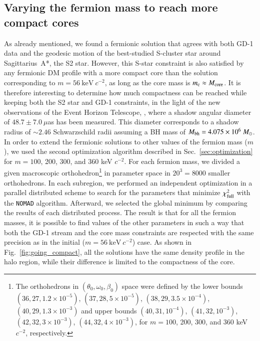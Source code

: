 \documentclass[twocolumn]{aa}
\begin{document}
\subsection{Varying the fermion mass to reach more compact cores}
As already mentioned, we found a fermionic solution that agrees with both GD-1 data and
the geodesic motion of the best-studied S-cluster star around Sagittarius~A*, the S2 star.
However, this S-star constraint is also satisfied by any fermionic DM profile
with a more compact core than the solution corresponding to $m=56~\mathrm{keV}~c^{-2}$,
as long as the core mass is $m_\mathrm{c}\approx M_{\rm{core}}$.
It is therefore interesting to determine how much compactness can be reached
while keeping both the S2 star and \hbox{GD-1} constraints, in the light of the new observations
of the Event Horizon Telescope, \cite{EHT_image}, where a shadow angular diameter of $48.7\pm7.0~\mu$as
has been measured. This diameter corresponds to a shadow radius of $\sim 2.46$ Schwarzschild radii assuming
a BH mass of $M_{\rm{bh}}=4.075\times10^6~M_\odot$.
In order to extend the fermionic solutions to other values of the fermion mass ($m$), we used the second optimization algorithm described in Sec.~\ref{sec:optimization} for $m=100$, 200, 300, and 360 keV $c^{-2}$. For each fermion mass, we divided a given macroscopic
orthohedron\footnote{The orthohedrons in $(\theta_0, \omega_0, \beta_0)$ space were defined by the
lower bounds $(36, 27, 1.2\times10^{-5})$, $(37, 28, 5\times10^{-5})$, $(38, 29, 3.5\times10^{-4})$, $(40, 29, 1.3\times10^{-3})$ and
upper bounds $(40, 31, 10^{-4})$, $(41, 32, 10^{-3})$, $(42, 32, 3\times10^{-3})$, $(44, 32, 4\times10^{-3})$, for $m=100$, 200, 300, and 360 keV $c^{-2}$, respectively.}
in parameter space in $20^3=8000$ smaller orthohedrons. In each subregion, we performed an independent optimization in a parallel distributed scheme to search for the parameters that minimize $\chi^2_{\rm{full}}$ with the \texttt{NOMAD} algorithm. Afterward, we selected the global minimum by comparing the results of each distributed process.
The result is that for all the fermion masses, it is possible to find values of the other parameters in such a way that both the GD-1 stream and the core mass constraints  are respected with the same precision as in the initial ($m=56~\mathrm{keV}~c^{-2}$) case. As shown in Fig.~\ref{fig:going_compact}, all the solutions have the same density profile in the halo region, while their difference is limited to the compactness of the core.
\end{document}
